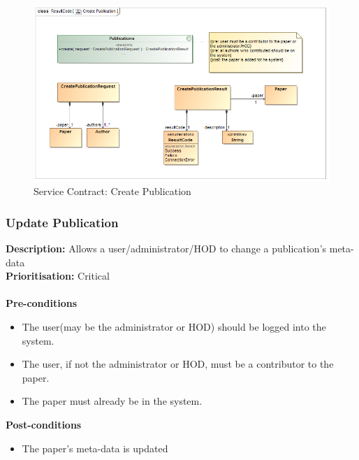 \documentclass[a4paper]{article}
\begin{document}
        	\begin{figure}[H]
        		\centering
        		\includegraphics[width=\textwidth]{5.1.5.Create.Publication.Services.Contract.png}
        		\caption{Service Contract: Create Publication}
        	\end{figure}
\pagebreak
    \subsubsection{Update Publication}
    
    \textbf{Description:} Allows a user/administrator/HOD to change a publication's meta-data\\
    \textbf{Prioritisation:} Critical\\
    \\
    
    \textbf{Pre-conditions}
     \begin{itemize}
        \item The user(may be the administrator or HOD) should be logged into the system.
        \item The user, if not the administrator or HOD, must be a contributor to the paper.
        \item The paper must already be in the system.
   \end{itemize}
    
    \textbf{Post-conditions}
    \begin{itemize}
        \item The paper's meta-data is updated
    \end{itemize}
    
\end{document}
